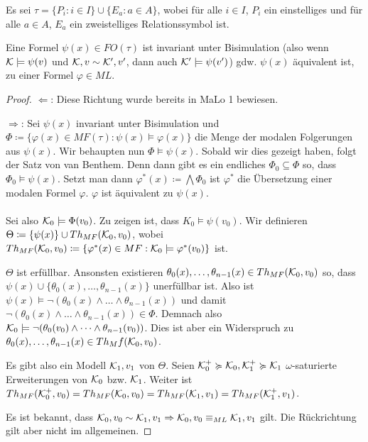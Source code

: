 \begin{satz}
	Es sei $\tau=\{P_i:i\in I\}\cup\{E_a : a\in A\}$, wobei für alle $i\in I$, $P_i$ ein einstelliges und für alle $a\in A$, $E_a$ ein zweistelliges Relationssymbol ist.
	
	Eine Formel $\psi(x)\in FO(\tau)$ ist invariant unter Bisimulation (also wenn $\mathcal{K}\models\psi(v)$ und $\mathcal{K},v\sim\mathcal{K}',v'$, dann auch $\mathcal{K}'\models\psi(v')$) gdw. $\psi(x)$ äquivalent ist, zu einer Formel $\varphi\in ML$.
\end{satz}
\begin{proof}
	$\Leftarrow$: Diese Richtung wurde bereits in MaLo 1 bewiesen.
	
	$\Rightarrow$: Sei $\psi(x)$ invariant unter Bisimulation und $\Phi\coloneqq\{\varphi(x) \in MF(\tau) : \psi(x)\models\varphi(x)\}$ die Menge der modalen Folgerungen aus $\psi(x)$.
	Wir behaupten nun $\Phi\models \psi(x)$. Sobald wir dies gezeigt haben, folgt der Satz von van Benthem. Denn dann gibt es ein endliches $\Phi_0\subseteq\Phi$ so, dass $\Phi_0\models \psi(x)$. Setzt man dann $\varphi^\ast(x)\coloneqq\bigwedge\Phi_0$ ist $\varphi^\ast$ die Übersetzung einer modalen Formel $\varphi$. $\varphi$ ist äquivalent zu $\psi(x)$.
	\\
	\\
	Sei also $\mathcal{K}_0\models\Phi(v_0)$. Zu zeigen ist, dass $K_0\models\psi(v_0)$. Wir definieren $\Theta\coloneqq\{\psi(x)\}\cup Th_{MF}(\mathcal{K}_0,v_0)$, wobei $Th_{MF}(\mathcal{K}_0,v_0)\coloneqq\{\varphi^\ast(x)\in MF : \mathcal{K}_0\models\varphi^\ast(v_0)\}$ ist.
	
	$\Theta$ ist erfüllbar. Ansonsten existieren $\theta_0(x),\dots,\theta_{n-1}(x)\in Th_{MF}(\mathcal{K}_0,v_0)$ so, dass $\psi(x)\cup\{\theta_0(x),\dots,\theta_{n-1}(x)\}$ unerfüllbar ist. 
	Also ist $\psi(x)\models\neg(\theta_0(x)\land\dots\land\theta_{n-1}(x))$ und damit $\neg(\theta_0(x)\land\dots\land\theta_{n-1}(x))\in\Phi$. Demnach also $\mathcal{K}_0\models\neg(\theta_0(v_0)\land\dots\land\theta_{n-1}(v_0))$. Dies ist aber ein Widerspruch zu $\theta_0(x),\dots,\theta_{n-1}(x)\in Th_Mf(\mathcal{K}_0,v_0)$.
	
	Es gibt also ein Modell $\mathcal{K}_1,v_1$ von $\Theta$.
	Seien $\mathcal{K}_0^+\succcurlyeq\mathcal{K}_0,\mathcal{K}_1^+\succcurlyeq\mathcal{K}_1$ $\omega$-saturierte Erweiterungen von $\mathcal{K}_0$ bzw. $\mathcal{K}_1$. Weiter ist $Th_{MF}(\mathcal{K}_0^+,v_0)=Th_{MF}(\mathcal{K}_0,v_0)=Th_{MF}(\mathcal{K}_1,v_1)=Th_{MF}(\mathcal{K}_1^+,v_1)$.
	
	Es ist bekannt, dass $\mathcal{K}_0,v_0\sim \mathcal{K}_1,v_1 \Rightarrow \mathcal{K}_0,v_0\equiv_{ML}\mathcal{K}_1,v_1$ gilt. Die Rückrichtung gilt aber nicht im allgemeinen.
	

\end{proof}
